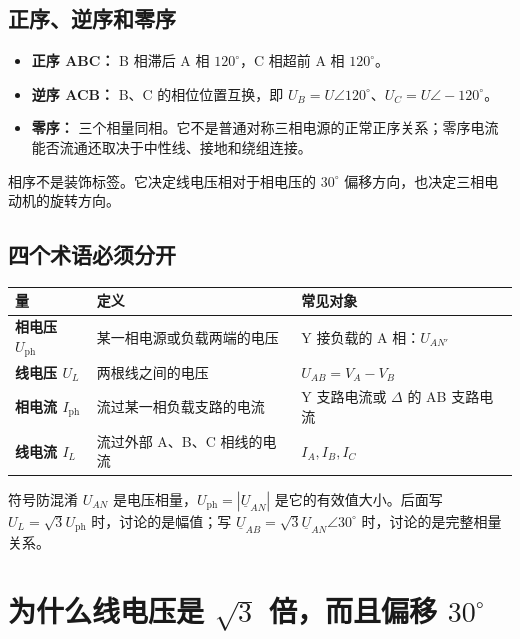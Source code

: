 \documentclass[circuit]{CarlosTexRpt}
\newcommand{\phas}[1]{\underline{#1}}
\begin{document}
\subsection{正序、逆序和零序}

\begin{itemize}[leftmargin=2em]
  \item \textbf{正序 ABC：} B 相滞后 A 相 \(120^\circ\)，C 相超前 A 相 \(120^\circ\)。
  \item \textbf{逆序 ACB：} B、C 的相位位置互换，即 \(U_B=U\angle120^\circ\)、\(U_C=U\angle-120^\circ\)。
  \item \textbf{零序：} 三个相量同相。它不是普通对称三相电源的正常正序关系；零序电流能否流通还取决于中性线、接地和绕组连接。
\end{itemize}
相序不是装饰标签。它决定线电压相对于相电压的 \(30^\circ\) 偏移方向，也决定三相电动机的旋转方向。

\subsection{四个术语必须分开}

\begin{center}
\begin{tabularx}{\textwidth}{>{\bfseries}p{2.3cm} X X}
\toprule
量 & 定义 & 常见对象 \\
\midrule
相电压 \(U_{\mathrm{ph}}\) & 某一相电源或负载两端的电压 & Y 接负载的 A 相：\(U_{AN'}\) \\
线电压 \(U_L\) & 两根线之间的电压 & \(U_{AB}=V_A-V_B\) \\
相电流 \(I_{\mathrm{ph}}\) & 流过某一相负载支路的电流 & Y 支路电流或 \(\Delta\) 的 AB 支路电流 \\
线电流 \(I_L\) & 流过外部 A、B、C 相线的电流 & \(I_A,I_B,I_C\) \\
\bottomrule
\end{tabularx}
\end{center}

\begin{warningbox}{符号防混淆}
\(U_{AN}\) 是电压相量，\(U_{\mathrm{ph}}=|\phas U_{AN}|\) 是它的有效值大小。后面写 \(U_L=\sqrt3 U_{\mathrm{ph}}\) 时，讨论的是幅值；写 \(\phas U_{AB}=\sqrt3\phas U_{AN}\angle30^\circ\) 时，讨论的是完整相量关系。
\end{warningbox}

\section{为什么线电压是 \texorpdfstring{$\sqrt3$}{sqrt(3)} 倍，而且偏移 \texorpdfstring{$30^\circ$}{30 degrees}}
\end{document}

